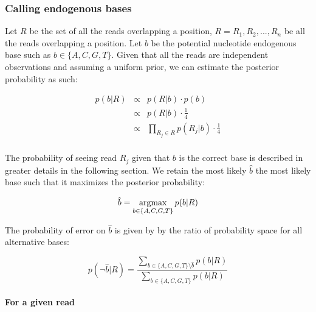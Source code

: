 \documentclass[a4paper,12pt]{article}
\newcommand{\argmax}{\operatornamewithlimits{argmax}}
\begin{document}
\subsubsection{Calling endogenous bases}
\label{sec:callingendobase}

\noindent Let $R$ be the set of all the reads overlapping a position, $R={R_1,R_2,...,R_n}$ be all the reads overlapping a position.  Let $b$ be the potential nucleotide endogenous base such as $b\in\{A,C,G,T\}$. Given that all the reads are independent observations and assuming a uniform prior, we can estimate the posterior probability as such:

\begin{eqnarray}
  p(b|R)   & \propto & p(R|b) \cdot p(b)  \\
  & \propto & p(R|b) \cdot \frac {1} {4} \\
  & \propto & \prod_{R_j \in R} p(R_j|b) \cdot \frac {1} {4} \\
\label{eqn:idenp}
\end{eqnarray} 


\noindent The probability of seeing read $R_j$ given that $b$ is the correct base is described in greater details in the following section.  We retain the most likely $\hat{b}$ the most likely base such that it maximizes the posterior probability:

\begin{equation}
\hat{b} = \argmax_{b \in \{A,C,G,T\} }   p(b|R)
\end{equation} 


\noindent  The probability of error on $\hat{b}$ is given by by the ratio of probability space for all alternative bases:

\begin{equation}
p(\neg \hat{b}|R) = \frac { \sum\limits_{ b \in \{A,C,G,T\}  \setminus \hat{b} } p(b|R) } { \sum\limits_{ b \in \{A,C,G,T\}  } p(b|R) }
\label{eqn:errormt}
\end{equation}














\noindent  \paragraph{For a given read}
\label{sec:forgivenread}
\end{document}

